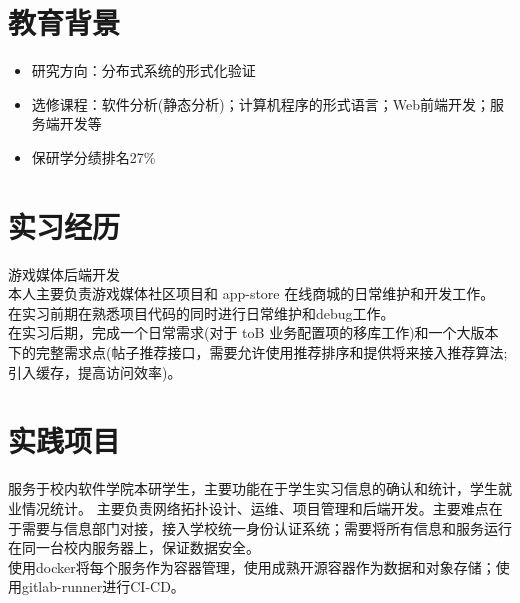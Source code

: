 \documentclass{resume}
\begin{document}

\sepspace
{}

\section{教育背景}
\begin{itemize}
    \item 研究方向：分布式系统的形式化验证
\end{itemize}
\begin{itemize}
    \item 选修课程：软件分析(静态分析)；计算机程序的形式语言；Web前端开发；服务端开发等
    \item 保研学分绩排名27\%
\end{itemize}
\sepspace

\section{实习经历}
\Content
{{游戏媒体后端开发}}
{
    {\\本人主要负责游戏媒体社区项目和 app-store 在线商城的日常维护和开发工作。}
    {\\在实习前期在熟悉项目代码的同时进行日常维护和debug工作。}
    {\\在实习后期，完成一个日常需求(对于 toB 业务配置项的移库工作)和一个大版本下的完整需求点(帖子推荐接口，需要允许使用推荐排序和提供将来接入推荐算法;引入缓存，提高访问效率)。}
    }
\sepspace

\section{实践项目}
\Contents
{服务于校内软件学院本研学生，主要功能在于学生实习信息的确认和统计，学生就业情况统计。}
{主要负责网络拓扑设计、运维、项目管理和后端开发。主要难点在于需要与信息部门对接，接入学校统一身份认证系统；需要将所有信息和服务运行在同一台校内服务器上，保证数据安全。\\使用docker将每个服务作为容器管理，使用成熟开源容器作为数据和对象存储；使用gitlab-runner进行CI-CD。 }
\end{document}
